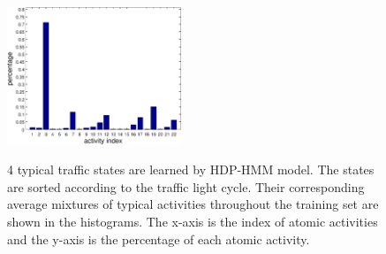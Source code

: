 \begin{figure}[!htp]
{\begin{minipage}{0.45\linewidth}
			\vfill
			\centering\includegraphics[width = 5.2cm]{figures/qmul/hist_s2-crop.pdf}
		\end{minipage}
		\label{fig:subfigure:state3}
	}
	\hfill
	\caption[Typical traffic states in QMUL Junction Dataset]{4 typical traffic states are learned by HDP-HMM model. The states are sorted according to the traffic light cycle. Their corresponding average mixtures of typical activities throughout the training set are shown in the histograms. The x-axis is the index of atomic activities and the y-axis is the percentage of each atomic activity.}
	\label{qmul_state}
\end{figure}

